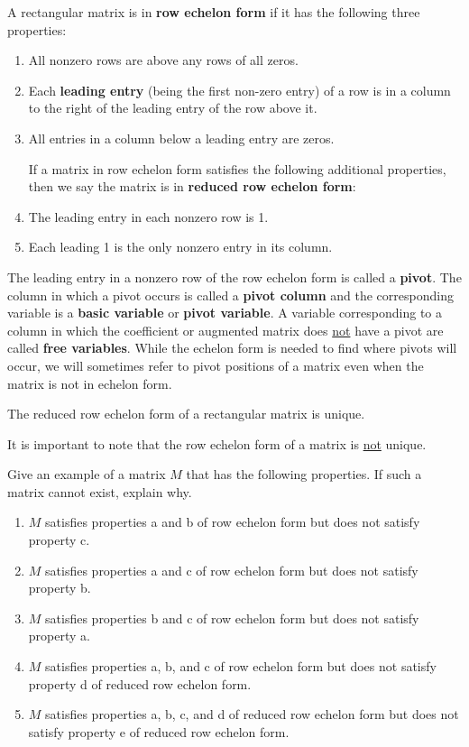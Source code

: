 A rectangular matrix is in \textbf{row echelon form} if it has the following three properties:
\begin{enumerate}
\item All nonzero rows are above any rows of all zeros.
\item Each \textbf{leading entry} (being the first non-zero entry) of a row is in a column to the right of the leading entry of the row above it.
\item All entries in a column below a leading entry are zeros.

If a matrix in row echelon form satisfies the following additional properties, then we say the matrix is in \textbf{reduced row echelon form}:

\item The leading entry in each nonzero row is 1.
\item Each leading 1 is the only nonzero entry in its column.
\end{enumerate}

The leading entry in a nonzero row of the row echelon form is called a \textbf{pivot}. The column in which a pivot occurs is called a \textbf{pivot column} and the corresponding variable is a \textbf{basic variable} or \textbf{pivot variable}. A variable corresponding to a column in which the coefficient or augmented matrix does \underline{not} have a pivot are called \textbf{free variables}. While the echelon form is needed to find where pivots will occur, we will sometimes refer to pivot positions of a matrix even when the matrix is not in echelon form.

\begin{theorem} The reduced row echelon form of a rectangular matrix is unique.
\end{theorem}
It is important to note that the row echelon form of a matrix is \underline{not} unique.
\begin{question} Give an example of a matrix $M$ that has the following properties. If such a matrix cannot exist, explain why.
\begin{enumerate}
\item $M$ satisfies properties a and b of row echelon form but does not satisfy property c.
\item $M$ satisfies properties a and c of row echelon form but does not satisfy property b.
\item $M$ satisfies properties b and c of row echelon form but does not satisfy property a.
\item $M$ satisfies properties a, b, and c of row echelon form but does not satisfy property d of reduced row echelon form.
\item $M$ satisfies properties a, b, c, and d of reduced row echelon form but does not satisfy property e of reduced row echelon form.
\end{enumerate}
\end{question}

